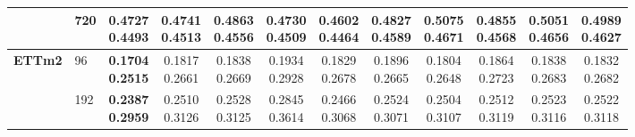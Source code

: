 \begin{longtable}{@{}llcccccccccc@{}}
 & 720 & \shortstack{\colorbox[gray]{0.92}{0.4727}\\\colorbox[gray]{0.92}{0.4493}} & \shortstack{0.4741\\0.4513} & \shortstack{0.4863\\0.4556} & \shortstack{0.4730\\0.4509} & \shortstack{\colorbox[gray]{0.82}{\textbf{0.4602}}\\\colorbox[gray]{0.82}{\textbf{0.4464}}} & \shortstack{0.4827\\0.4589} & \shortstack{0.5075\\0.4671} & \shortstack{0.4855\\0.4568} & \shortstack{0.5051\\0.4656} & \shortstack{0.4989\\0.4627} \\ \hline

\textbf{ETTm2} & 96 & \shortstack{\colorbox[gray]{0.82}{\textbf{0.1704}}\\\colorbox[gray]{0.82}{\textbf{0.2515}}} & \shortstack{0.1817\\0.2661} & \shortstack{0.1838\\0.2669} & \shortstack{0.1934\\0.2928} & \shortstack{0.1829\\0.2678} & \shortstack{0.1896\\0.2665} & \shortstack{\colorbox[gray]{0.92}{0.1804}\\\colorbox[gray]{0.92}{0.2648}} & \shortstack{0.1864\\0.2723} & \shortstack{0.1838\\0.2683} & \shortstack{0.1832\\0.2682} \\ \cline{2-12}

 & 192 & \shortstack{\colorbox[gray]{0.82}{\textbf{0.2387}}\\\colorbox[gray]{0.82}{\textbf{0.2959}}} & \shortstack{0.2510\\0.3126} & \shortstack{0.2528\\0.3125} & \shortstack{0.2845\\0.3614} & \shortstack{\colorbox[gray]{0.92}{0.2466}\\\colorbox[gray]{0.92}{0.3068}} & \shortstack{0.2524\\0.3071} & \shortstack{0.2504\\0.3107} & \shortstack{0.2512\\0.3119} & \shortstack{0.2523\\0.3116} & \shortstack{0.2522\\0.3118} \\ \cline{2-12}


\end{longtable}
